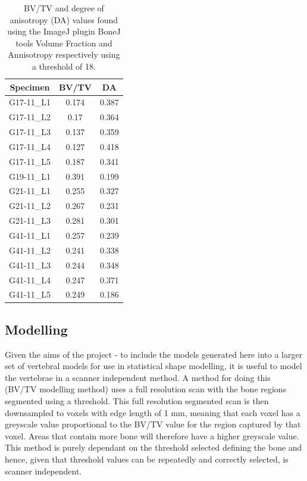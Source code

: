 \begin{table}[ht!]
	\caption{BV/TV and degree of anisotropy (DA) values found using the ImageJ
    plugin BoneJ tools Volume Fraction and Annisotropy respectively using a
    threshold of 18.}
	\label{tab:bv_tv_anis}
	\centering
	\begin{tabular}{c|c|c}
    Specimen                       & BV/TV & DA\\ \hline \hline
    G17-11\_L1  & 0.174 & 0.387 \\
    G17-11\_L2  & 0.17  & 0.364\\
    G17-11\_L3  & 0.137 & 0.359\\
    G17-11\_L4  & 0.127 & 0.418\\
    G17-11\_L5  & 0.187 & 0.341\\
    G19-11\_L1  & 0.391 & 0.199\\
    G21-11\_L1  & 0.255 & 0.327\\
    G21-11\_L2  & 0.267 & 0.231\\
    G21-11\_L3  & 0.281 & 0.301\\
    G41-11\_L1  & 0.257 & 0.239\\
    G41-11\_L2  & 0.241 & 0.338\\
    G41-11\_L3  & 0.244 & 0.348\\
    G41-11\_L4  & 0.247 & 0.371\\
    G41-11\_L5  & 0.249 & 0.186\\
    \hline
	\end{tabular}
\end{table}

\subsection{Modelling}

Given the aims of the project - to include the models generated here into a
larger set of vertebral models for use in statistical shape modelling, it is
useful to model the vertebrae in a scanner independent method. A method for
doing this (BV/TV modelling method) uses a full resolution scan with the bone
regions segmented using a threshold. This full resolution segmented scan is then
downsampled to voxels with edge length of 1 mm, meaning that each voxel has a
greyscale value proportional to the BV/TV value for the region captured by that
voxel. Areas that contain more bone will therefore have a higher greyscale
value. This method is purely dependant on the threshold selected defining the
bone and hence, given that threshold values can be repeatedly and correctly
selected, is scanner independent.


